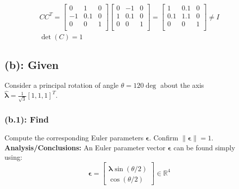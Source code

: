 \documentclass[titlepage]{article}
\begin{document}
\begin{mdframed}[linewidth=1pt, innertopmargin=10pt, innerbottommargin=10pt]
	\begin{equation}
		\begin{gathered}
			CC^T=
			\begin{bmatrix}
				0 & 1 & 0 \\
				-1 & 0.1 & 0 \\
				0 & 0 & 1 \\
			\end{bmatrix}
			\begin{bmatrix}
				0 & -1 & 0 \\
				1 & 0.1 & 0 \\
				0 & 0 & 1 \\
			\end{bmatrix}=
			\begin{bmatrix}
				1 & 0.1 & 0 \\
				0.1 & 1.1 & 0 \\
				0 & 0 & 1 \\
			\end{bmatrix}\ne I\\
			\det(C)=1
		\end{gathered}
	\end{equation}
\end{mdframed}

\subsection*{(b): Given}
Consider a principal rotation of angle $\theta=120\deg$ about the axis $\hat{\boldsymbol{\lambda}}=\frac{1}{\sqrt{3}}[1,1,1]^T$.

\subsubsection*{(b.1): Find}
Compute the corresponding Euler parameters $\boldsymbol{\epsilon}$. Confirm $\|\boldsymbol{\epsilon}\|=1$.\\

\textbf{Analysis/Conclusions:}
An Euler parameter vector $\boldsymbol{\epsilon}$ can be found simply using:
\begin{equation}
	\boldsymbol{\epsilon}=
	\begin{bmatrix}
		\hat{\boldsymbol{\lambda}}\sin(\theta/2) \\
		\cos(\theta/2)
	\end{bmatrix}\in\mathbb{R}^4
\end{equation}
\end{document}
